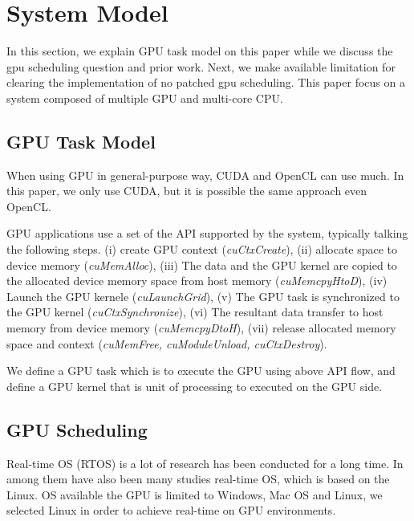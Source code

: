 \section{System Model}\label{sec:system_model}
In this section, we explain GPU task model on this paper while we discuss the gpu scheduling question and prior work.
Next, we make available limitation for clearing the implementation of no patched gpu scheduling.
This paper focus on a system composed of multiple GPU and multi-core CPU.

\subsection{GPU Task Model}
When using GPU in general-purpose way, CUDA and OpenCL can use much.
In this paper, we only use CUDA, but it is possible the same approach even OpenCL.

GPU applications use a set of the API supported by the system,
typically talking the following steps.
(i) create GPU context (\textit{cuCtxCreate}), 
(ii) allocate space to device memory (\textit{cuMemAlloc}), 
(iii) The data and the GPU kernel are copied to the allocated device memory space from host memory (\textit{cuMemcpyHtoD}), 
(iv) Launch the GPU kernele (\textit{cuLaunchGrid}), 
(v) The GPU task is synchronized to the GPU kernel (\textit{cuCtxSynchronize}), 
(vi) The resultant data transfer to host memory from device memory (\textit{cuMemcpyDtoH}), 
(vii) release allocated memory space and context (\textit{cuMemFree, cuModuleUnload, cuCtxDestroy}).

We define a GPU task which is to execute the GPU using above API flow,
and define a GPU kernel that is unit of processing to executed on the GPU side.


\subsection{GPU Scheduling}
Real-time OS (RTOS) is a lot of research\cite{spring, redline,itron,rk} has been conducted for a long time.
In among them have also been many studies\cite{prk,rtai,yodaiken1999rtlinux,litmus,kato:loadable} real-time OS, which is based on the Linux.
OS available the GPU is limited to Windows, Mac OS and Linux,
we selected Linux in order to achieve real-time on GPU environments.


